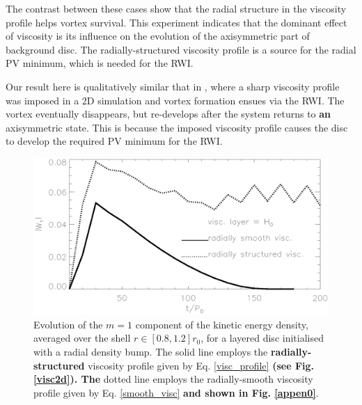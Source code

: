   The contrast between these cases show that the radial structure
  in the viscosity profile helps vortex survival. This experiment
  indicates that the dominant effect of viscosity is its
  influence on the evolution of the axisymmetric part of background
  disc. The radially-structured viscosity profile is a source for the
  radial PV minimum, which is needed for the RWI.  

  Our result here is qualitatively similar that in \cite{regaly12},
  where a sharp viscosity profile was imposed in a 2D simulation and 
  vortex formation ensues via the RWI. The vortex eventually
  disappears, but re-develops after the system returns to {\bf an}
  axisymmetric state. This is because the imposed viscosity profile
  causes the disc to develop the required PV minimum for the RWI. 

 \begin{figure}
  \centering
  \includegraphics[width=\linewidth]{figures/pdisk_kerz_cases_appendix1.ps}
  \caption{Evolution of the $m=1$ component of the kinetic energy
    density, averaged over the shell $r\in[0.8,1.2]r_0$, for a layered 
    disc initialised with a radial density bump. 
    The solid line employs the {\bf radially-structured} viscosity profile given by 
    Eq. \ref{visc_profile} {\bf (see Fig.\ref{visc2d}). The} dotted line employs the radially-smooth
    viscosity profile given by Eq. \ref{smooth_visc} {\bf and shown in Fig. \ref{appen0}}. \label{appen} }
  \end{figure}
